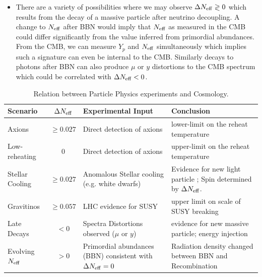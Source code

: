 \begin{itemize}
\item There are a variety of possibilities where we may observe $\Delta N_{\rm eff} \gtrless 0$ which results from the decay of a massive particle after neutrino decoupling.  A change to $N_{\rm eff}$ after BBN would imply that $N_{\rm eff}$ as measured in the CMB could differ significantly from the value inferred from primordial abundances.  From the CMB, we can measure $Y_p$ and $N_{\rm eff}$ simultaneously which implies such a signature can even be internal to the CMB.  Similarly decays to photons after BBN can also produce $\mu$ or $y$ distortions to the CMB spectrum which could be correlated with $\Delta N_{\rm eff} < 0$.
\end{itemize}


\begin{table}[t!]
\begin{center}
\begin{tabular}
{| l | c | p{5cm} | p{5cm} | }\hline Scenario & $\Delta N_{\rm eff}$ & Experimental Input & Conclusion \\
\hline 
Axions & $\geq 0.027$  & Direct detection of axions & lower-limit on the reheat temperature
\\  
Low-reheating & $0$  & Direct detection of axions & upper-limit on the reheat temperature
\\    
Stellar Cooling & $\geq 0.027$  & Anomalous Stellar cooling (e.g. white dwarfs) & Evidence for new light particle ; Spin determined by $\Delta N_{\rm eff}$.  
\\    
Gravitinos & $\geq 0.057$  & LHC evidence for SUSY & upper limit on scale of SUSY breaking
\\  
Late Decays & $< 0$  & Spectra Distortions observed ($\mu$ or $y$) & evidence for new massive particle; energy injection
\\ 
Evolving $N_{\rm eff}$ & $> 0$  & Primordial abundances (BBN) consistent with $\Delta N_{\rm eff} =0$ & Radiation density changed between BBN and Recombination
\\  
\hline 
\end{tabular}
\caption{Relation between Particle Physics experiments and Cosmology.}
\label{table:darkscenarios}
\end{center}
\end{table} 








